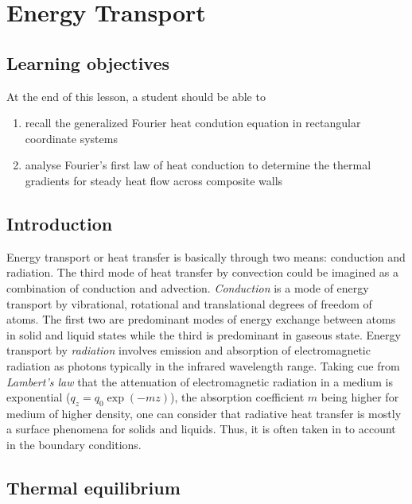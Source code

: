 \chapter{Energy Transport}
\label{ch:energytransport}

\section{Learning objectives}

At the end of this lesson, a student should be able to 
\begin{enumerate}
\item recall the generalized Fourier heat condution equation in rectangular coordinate systems
\item analyse Fourier's first law of heat conduction to determine the thermal gradients for steady heat flow across composite walls
\end{enumerate}


\section{Introduction}
Energy transport or heat transfer is basically through two means: conduction and radiation. The third mode of heat transfer by convection could be imagined as a combination of conduction and advection. \textit{Conduction} is a mode of energy transport by vibrational, rotational and translational degrees of freedom of atoms. The first two are predominant modes of energy exchange between atoms in solid and liquid states while the third is predominant in gaseous state. Energy transport by \textit{radiation} involves emission and absorption of electromagnetic radiation as photons typically in the infrared wavelength range. Taking cue from \textit{Lambert's law} that the attenuation of electromagnetic radiation in a medium is exponential ($ q_z = q_0 \exp\left(-mz\right)$), the absorption coefficient $m$ being higher for medium of higher density, one can consider that radiative heat transfer is mostly a surface phenomena for solids and liquids. Thus, it is often taken in to account in the boundary conditions.


\section{Thermal equilibrium}

